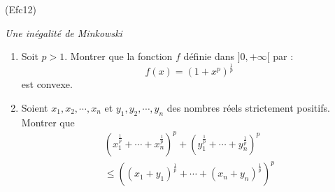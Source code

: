 \begin{tiny}(Efc12)\end{tiny} \emph{Une inégalité de Minkowski}
\begin{enumerate}
 \item Soit $p>1$. Montrer que la fonction $f$ définie dans $]0,+\infty[$ par :
\begin{displaymath}
 f(x) = (1+x^p)^{\frac{1}{p}}
\end{displaymath}
est convexe.
\item Soient $x_1,x_2, \cdots, x_n$ et $y_1, y_2, \cdots, y_n$ des nombres réels strictement positifs. Montrer que
\begin{multline*}
 \left(x_1^{\frac{1}{p}}+\cdots+x_n^{\frac{1}{p}} \right)^p 
+ \left(y_1^{\frac{1}{p}}+\cdots+y_n^{\frac{1}{p}} \right)^p \\
\leq
\left((x_1+y_1)^{\frac{1}{p}}+\cdots+(x_n+y_n)^{\frac{1}{p}} \right)^p
\end{multline*}

\end{enumerate}
